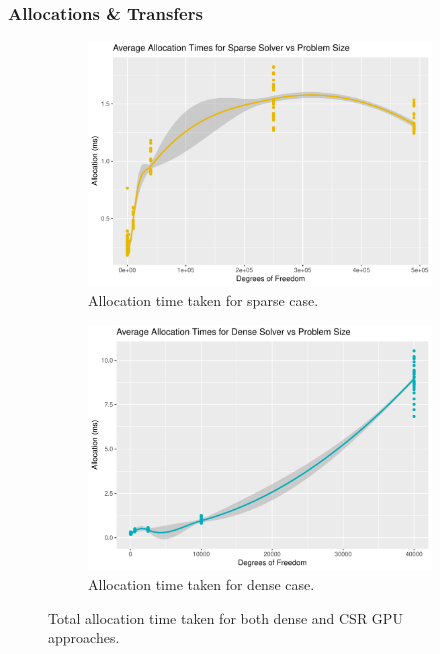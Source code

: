 \subsubsection{Allocations \& Transfers}

\begin{figure}
	\centering
	\begin{subfigure}{0.48\linewidth}
		\centering
		\includegraphics[width = \linewidth]{Plots/alloc_sparse_vs_n}
		\caption{Allocation time taken for sparse case.}
		\label{fig:alloc_sparse}
	\end{subfigure}\hfill
	\begin{subfigure}{0.48\linewidth}
		\centering
		\includegraphics[width=\linewidth]{Plots/alloc_dense_vs_n}
		\caption{Allocation time taken for dense case.}
		\label{fig:alloc_dense}
	\end{subfigure}
	\caption{Total allocation time taken for both dense and CSR GPU approaches.}
	\label{fig:alloc}
\end{figure}
